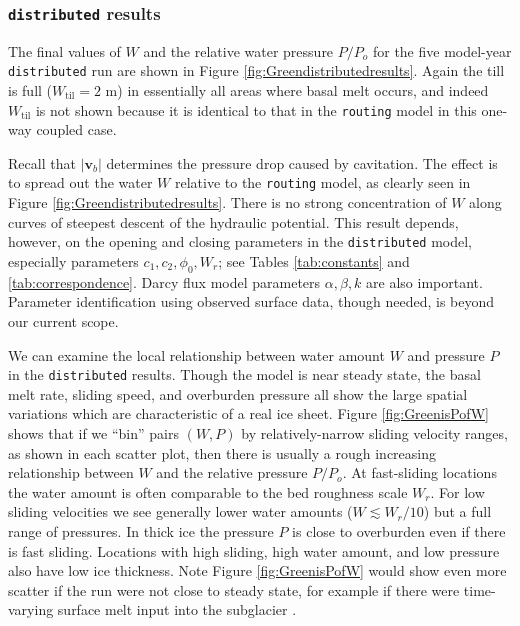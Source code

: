 \documentclass[gmd]{copernicus}   %
\newcommand{\text}{\textrm}
\newcommand\bv{\mathbf{v}}
\newcommand{\Wtil}{W_{\text{til}}}
\begin{document}
\subsubsection{\texttt{distributed} results}  The final values of $W$ and the relative water pressure $P/P_o$ for the five model-year \texttt{distributed} run are shown in Figure \ref{fig:Greendistributedresults}.  Again the till is full ($\Wtil=2$ m) in essentially all areas where basal melt occurs, and indeed $\Wtil$ is not shown because it is identical to that in the \texttt{routing} model in this one-way coupled case.

Recall that $|\bv_b|$ determines the pressure drop caused by cavitation.  The effect is to spread out the water $W$ relative to the \texttt{routing} model, as clearly seen in Figure \ref{fig:Greendistributedresults}.  There is no strong concentration of $W$ along curves of steepest descent of the hydraulic potential.  This result depends, however, on the opening and closing parameters in the \texttt{distributed} model, especially parameters $c_1,c_2,\phi_0,W_r$; see Tables \ref{tab:constants} and \ref{tab:correspondence}.  Darcy flux model parameters $\alpha,\beta,k$ are also important.  Parameter identification using observed surface data, though needed, is beyond our current scope.

We can examine the local relationship between water amount $W$ and pressure $P$ in the \texttt{distributed} results.  Though the model is near steady state, the basal melt rate, sliding speed, and overburden pressure all show the large spatial variations which are characteristic of a real ice sheet.  Figure \ref{fig:GreenisPofW} shows that if we ``bin'' pairs $(W,P)$ by relatively-narrow sliding velocity ranges, as shown in each scatter plot, then there is usually a rough increasing relationship between $W$ and the relative pressure $P/P_o$.  At fast-sliding locations the water amount is often comparable to the bed roughness scale $W_r$.  For low sliding velocities we see generally lower water amounts ($W \lesssim W_r/10$) but a full range of pressures.  In thick ice the pressure $P$ is close to overburden even if there is fast sliding.  Locations with high sliding, high water amount, and low pressure also have low ice thickness.  Note Figure \ref{fig:GreenisPofW} would show even more scatter if the run were not close to steady state, for example if there were time-varying surface melt input into the subglacier \citep{vanPeltthesis}.
\end{document}
